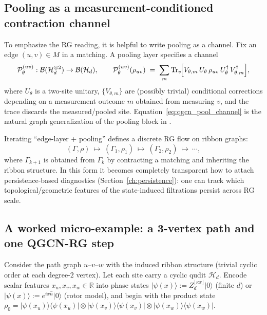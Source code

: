 \documentclass[11pt,oneside]{amsbook}
\numberwithin{equation}{section}
\theoremstyle{plain}
\theoremstyle{definition}
\theoremstyle{remark}
\newcommand{\ket}[1]{\lvert #1 \rangle}
\newcommand{\bra}[1]{\langle #1 \rvert}
\begin{document}
\subsection{Pooling as a measurement-conditioned contraction channel}
\label{subsec:qgcn_pooling_channel}

To emphasize the RG reading, it is helpful to write pooling as a channel.
Fix an edge $(u,v)\in M$ in a matching.
A pooling layer specifies a channel
\begin{equation}
  \mathcal{P}_{\theta}^{(uv)}:\mathcal{B}(\mathcal{H}_d^{\otimes 2})\to \mathcal{B}(\mathcal{H}_d),
  \qquad
  \mathcal{P}_{\theta}^{(uv)}(\rho_{uv})
  \;=\;
  \sum_{m} \mathrm{Tr}_{v}\!\Bigl[
    V_{\theta,m}\,U_{\theta}\,\rho_{uv}\,U_{\theta}^\dagger\,V_{\theta,m}^\dagger
  \Bigr],
  \label{eq:qgcn_pool_channel}
\end{equation}
where $U_\theta$ is a two-site unitary, $\{V_{\theta,m}\}$ are (possibly trivial) conditional corrections depending on a
measurement outcome $m$ obtained from measuring $v$, and the trace discards the measured/pooled site.
Equation~\eqref{eq:qgcn_pool_channel} is the natural graph generalization of the pooling block in \cite{Zheng2021QGCN}.

Iterating ``edge-layer + pooling'' defines a discrete RG flow on ribbon graphs:
\[
(\Gamma,\rho)\ \longmapsto\ (\Gamma_1,\rho_1)\ \longmapsto\ (\Gamma_2,\rho_2)\ \longmapsto\ \cdots,
\]
where $\Gamma_{k+1}$ is obtained from $\Gamma_k$ by contracting a matching and inheriting the ribbon structure.
In this form it becomes completely transparent how to attach persistence-based diagnostics (Section~\ref{ch:persistence}):
one can track which topological/geometric features of the state-induced filtrations persist across RG scale.

\subsection{A worked micro-example: a 3-vertex path and one QGCN-RG step}
\label{subsec:qgcn_micro_example}

Consider the path graph $u$--$v$--$w$ with the induced ribbon structure (trivial cyclic order at each degree-$2$ vertex).
Let each site carry a cyclic qudit $\mathcal{H}_d$.
Encode scalar features $x_u,x_v,x_w\in\mathbb{R}$ into phase states
$\ket{\psi(x)}:=Z_d^{\lfloor \kappa x\rfloor}\ket{0}$ (finite $d$) or $\ket{\psi(x)}:=e^{ix\hat n}\ket{0}$ (rotor model),
and begin with the product state
$\rho_0=\ket{\psi(x_u)}\!\bra{\psi(x_u)}\otimes \ket{\psi(x_v)}\!\bra{\psi(x_v)}\otimes \ket{\psi(x_w)}\!\bra{\psi(x_w)}$.
\end{document}
